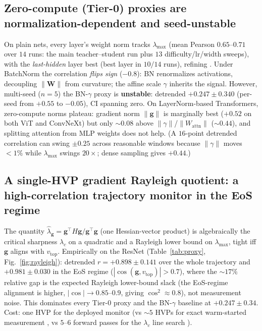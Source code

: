 \documentclass{article}
\theoremstyle{plain}
\theoremstyle{definition}
\theoremstyle{remark}
\newcommand{\lmax}{\lambda_{\max}}
\newcommand{\lhatg}{\hat{\lambda}_{\mathbf{g}}}
\begin{document}
\subsection{Zero-compute (Tier-0) proxies are normalization-dependent and seed-unstable}
On plain nets, every layer's weight norm tracks $\lmax$ (mean Pearson
$0.65$--$0.71$ over $14$ runs: the main teacher--student run plus $13$
difficulty/lr/width sweeps), with the \emph{last-hidden} layer best (best
layer in $10/14$ runs), refining
\citet{li2022sharpness}. Under BatchNorm the correlation \emph{flips sign}
($-0.8$): BN renormalizes activations, decoupling $\|\mathbf{W}\|$ from
curvature; the affine scale $\gamma$ inherits the signal. However, multi-seed
($n=5$) the BN-$\gamma$ proxy is \textbf{unstable}: detrended
$+0.247\!\pm\!0.340$ (per-seed from $+0.55$ to $-0.05$), CI spanning zero. On
LayerNorm-based Transformers, zero-compute norms plateau: gradient norm
$\|\mathbf{g}\|$ is marginally best ($+0.52$ on both ViT and ConvNeXt) but only
$\sim\!0.08$ above $\|\gamma\|$/$\|W_{\mathrm{attn}}\|$ ($\sim\!0.44$), and
splitting attention from MLP weights does not help. (A $16$-point detrended
correlation can swing $\pm0.25$ across reasonable windows because $\|\gamma\|$
moves $<\!1\%$ while $\lmax$ swings $20\times$; dense sampling gives $+0.44$.)

\subsection{A single-HVP gradient Rayleigh quotient: a high-correlation trajectory monitor in the EoS regime}
The quantity $\lhatg=\mathbf{g}^{\!\top}\!H\mathbf{g}/\mathbf{g}^{\!\top}\!\mathbf{g}$
(one Hessian-vector product) is algebraically the critical sharpness
$\lambda_c$ on a quadratic \citep{kalra2026scalable} and a Rayleigh lower bound
on $\lmax$, tight iff $\mathbf{g}$ aligns with $v_{\mathrm{top}}$. Empirically on
the ResNet (Table~\ref{tab:proxy}, Fig.~\ref{fig:rayleigh}): detrended
$r=+0.898\!\pm\!0.141$ over the whole trajectory and $+0.981\!\pm\!0.030$ in the
EoS regime ($|\cos(\mathbf{g},v_{\mathrm{top}})|>0.7$), where the $\sim\!17\%$
relative gap is the expected Rayleigh lower-bound slack (the EoS-regime
alignment is higher, $|\cos|\!\to\!0.85$--$0.9$, giving $\cos^{2}\!\approx\!0.8$),
not measurement noise. This dominates every Tier-0 proxy and the BN-$\gamma$
baseline at $+0.247\!\pm\!0.34$. Cost: one HVP for the deployed monitor (vs
$\sim\!5$ HVPs for exact warm-started measurement \citealp{ramasinghe2026taming},
vs $5$--$6$ forward passes for the $\lambda_c$ line search
\citealp{kalra2026scalable}).
\end{document}
